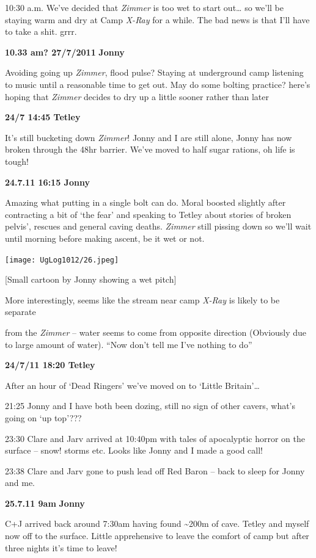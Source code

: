 10:30 a.m. We've decided that \emph{Zimmer} is too wet to start
out\ldots{} so we'll be staying warm and dry at Camp \emph{X-Ray} for a
while. The bad news is that I'll have to take a shit. grrr.

\textbf{10.33 am? 27/7/2011} \textbf{Jonny}

Avoiding going up \emph{Zimmer}, flood pulse? Staying at underground
camp listening to music until a reasonable time to get out. May do some
bolting practice? here's hoping that \emph{Zimmer} decides to dry up a
little sooner rather than later

\textbf{24/7 14:45 Tetley}

It's still bucketing down \emph{Zimmer}! Jonny and I are still alone,
Jonny has now broken through the 48hr barrier. We've moved to half sugar
rations, oh life is tough!

\textbf{24.7.11 16:15 Jonny}

Amazing what putting in a single bolt can do. Moral boosted slightly
after contracting a bit of `the fear' and speaking to Tetley about
stories of broken pelvis', rescues and general caving deaths.
\emph{Zimmer} still pissing down so we'll wait until morning before
making ascent, be it wet or not.

\texttt{[image: UgLog1012/26.jpeg]}

{[}Small cartoon by Jonny showing a wet pitch{]}

More interestingly, seems like the stream near camp \emph{X-Ray} is
likely to be separate

from the \emph{Zimmer} -- water seems to come from opposite direction
(Obviously due to large amount of water). ``Now don't tell me I've
nothing to do''

\textbf{24/7/11 18:20 Tetley}

After an hour of `Dead Ringers' we've moved on to `Little
Britain'\ldots{}

21:25 Jonny and I have both been dozing, still no sign of other cavers,
what's going on `up top'???

23:30 Clare and Jarv arrived at 10:40pm with tales of apocalyptic horror
on the surface -- snow! storms etc. Looks like Jonny and I made a good
call!

23:38 Clare and Jarv gone to push lead off Red Baron -- back to sleep
for Jonny and me.

\textbf{25.7.11 9am} \textbf{Jonny}

C+J arrived back around 7:30am having found \textasciitilde{}200m of
cave. Tetley and myself now off to the surface. Little apprehensive to
leave the comfort of camp but after three nights it's time to leave!

